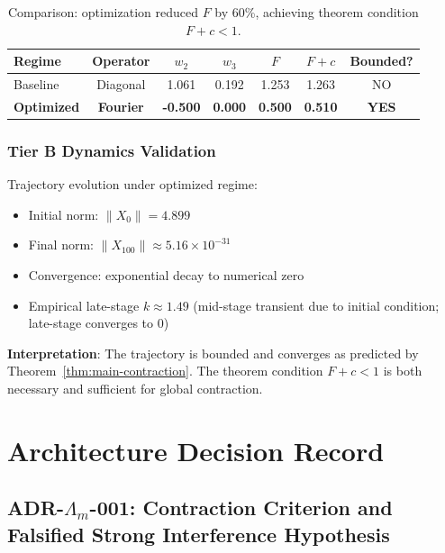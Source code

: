 \documentclass[11pt,a4paper]{article}
\begin{document}
\begin{table}[h]
\centering
\begin{tabular}{lcccccc}
\toprule
\textbf{Regime} & \textbf{Operator} & \textbf{\(w_2\)} & \textbf{\(w_3\)} & \textbf{\(F\)} & \textbf{\(F+c\)} & \textbf{Bounded?} \\
\midrule
Baseline & Diagonal & 1.061 & 0.192 & 1.253 & 1.263 & NO \\
\textbf{Optimized} & \textbf{Fourier} & \textbf{-0.500} & \textbf{0.000} & \textbf{0.500} & \textbf{0.510} & \textbf{YES} \\
\bottomrule
\end{tabular}
\caption{Comparison: optimization reduced \(F\) by 60\%, achieving theorem condition \(F+c<1\).}
\label{tab:optimization-comparison}
\end{table}

\subsubsection{Tier B Dynamics Validation}

Trajectory evolution under optimized regime:
\begin{itemize}
\item Initial norm: \(\|X_0\| = 4.899\)
\item Final norm: \(\|X_{100}\| \approx 5.16 \times 10^{-31}\)
\item Convergence: exponential decay to numerical zero
\item Empirical late-stage \(k \approx 1.49\) (mid-stage transient due to initial condition; late-stage converges to 0)
\end{itemize}

\textbf{Interpretation}: The trajectory is bounded and converges as predicted by Theorem~\ref{thm:main-contraction}. The theorem condition \(F+c<1\) is both necessary and sufficient for global contraction.

\section{Architecture Decision Record}

\subsection{ADR-\(\Lambda_m\)-001: Contraction Criterion and Falsified Strong Interference Hypothesis}
\end{document}
